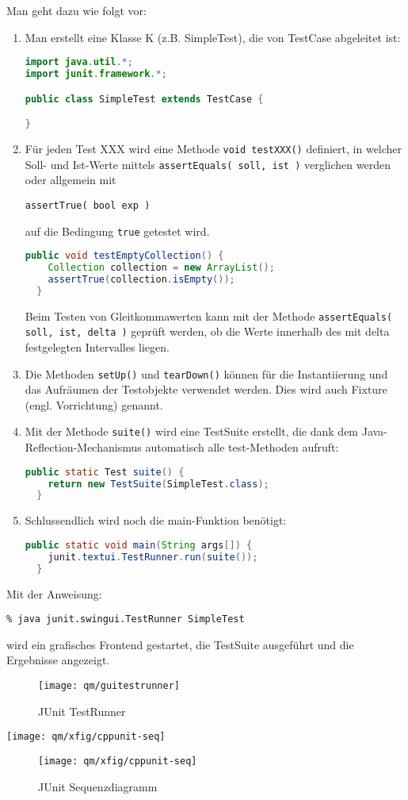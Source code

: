 Man geht dazu wie folgt vor:
\begin{enumerate}
\item Man erstellt eine Klasse K
  (z.B. SimpleTest), die von TestCase abgeleitet
 ist:
\begin{lstlisting}[language=java]
import java.util.*;
import junit.framework.*;

public class SimpleTest extends TestCase {

}
\end{lstlisting}
\newslide
\item Für jeden Test XXX wird eine Methode \lstinline{void testXXX()}
  definiert,
  in welcher Soll- und Ist-Werte mittels \lstinline{assertEquals( soll, ist )}
   verglichen werden
  oder allgemein mit

\lstinline{assertTrue( bool exp )}

auf die Bedingung \verb+true+ getestet wird.
\begin{lstlisting}[language=java]
  public void testEmptyCollection() {
    Collection collection = new ArrayList();
    assertTrue(collection.isEmpty());
  }
 \end{lstlisting}
  Beim Testen von Gleitkommawerten kann mit der Methode
  \lstinline{assertEquals( soll, ist, delta )} geprüft werden, ob die Werte
  innerhalb des mit delta festgelegten Intervalles liegen.
\newslide
\item Die Methoden \verb|setUp()| und \verb|tearDown()|
können für die Instantiierung und das Aufräumen
  der Testobjekte verwendet werden. Dies wird auch Fixture (engl.
  Vorrichtung) genannt.
\item Mit der Methode \verb+suite()+ wird eine TestSuite erstellt,
  die dank dem Java-Reflection-Mechanismus automatisch alle test-Methoden
  aufruft:
\begin{lstlisting}[language=java]
  public static Test suite() {
    return new TestSuite(SimpleTest.class);
  }
\end{lstlisting}
\newslide
\item Schlussendlich wird noch die main-Funktion benötigt:
\begin{lstlisting}[language=java]
  public static void main(String args[]) {
    junit.textui.TestRunner.run(suite());
  }
\end{lstlisting}
\end{enumerate}
Mit der Anweisung:
\begin{verbatim}
% java junit.swingui.TestRunner SimpleTest
\end{verbatim}
wird ein grafisches Frontend gestartet,
die TestSuite ausgeführt und die Ergebnisse angezeigt.
\begin{figure}[H]
\begin{center}
\texttt{[image: qm/guitestrunner]}
\end{center}
\caption{JUnit TestRunner}
\end{figure}
\ifslides
\newpage
\texttt{[image: qm/xfig/cppunit-seq]}
\else
\begin{figure}[H]
\texttt{[image: qm/xfig/cppunit-seq]}
\caption{JUnit Sequenzdiagramm}
\end{figure}
\fi

